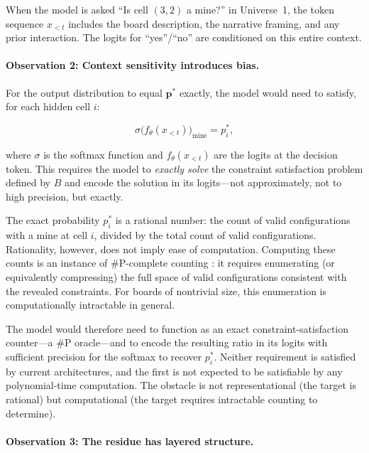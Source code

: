\documentclass[12pt,a4paper]{article}
\theoremstyle{definition}
\theoremstyle{remark}
\begin{document}
When the model is asked ``Is cell $(3,2)$ a mine?'' in Universe~1,
the token sequence $x_{<t}$ includes the board description, the
narrative framing, and any prior interaction.  The logits for
``yes''/``no'' are conditioned on this entire context.

\paragraph{Observation 2: Context sensitivity introduces bias.}

For the output distribution to equal $\mathbf{p}^*$ exactly, the
model would need to satisfy, for each hidden cell $i$:

\begin{equation}\label{eq:exactness-condition}
  \sigma\bigl(f_\theta(x_{<t})\bigr)_{\text{mine}} = p_i^*,
\end{equation}

where $\sigma$ is the softmax function and $f_\theta(x_{<t})$ are the
logits at the decision token.  This requires the model to
\emph{exactly solve} the constraint satisfaction problem defined by
$B$ and encode the solution in its logits---not approximately, not to
high precision, but exactly.

The exact probability $p_i^*$ is a rational number: the count of
valid configurations with a mine at cell $i$, divided by the total
count of valid configurations.  Rationality, however, does not imply
ease of computation.  Computing these counts is an instance of
\textsc{\#P}-complete counting \citep{Kaye2000}: it requires
enumerating (or equivalently compressing) the full space of valid
configurations consistent with the revealed constraints.  For boards
of nontrivial size, this enumeration is computationally intractable
in general.

The model would therefore need to function as an exact
constraint-satisfaction counter---a \textsc{\#P} oracle---and to
encode the resulting ratio in its logits with sufficient precision
for the softmax to recover $p_i^*$.  Neither requirement is
satisfied by current architectures, and the first is not expected to
be satisfiable by any polynomial-time computation.  The obstacle is
not representational (the target is rational) but computational (the
target requires intractable counting to determine).

\paragraph{Observation 3: The residue has layered structure.}
\end{document}

